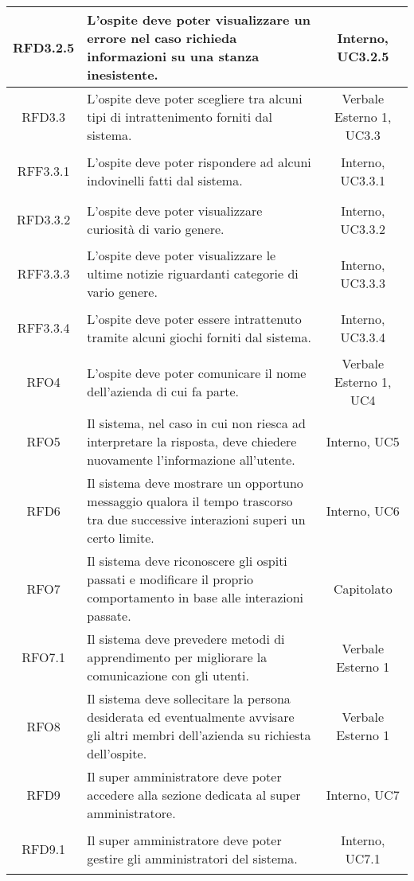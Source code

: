 \begin{longtable}{|c|>{\centering}m{7cm}|c|}
\hypertarget{RFD3.2.5}{RFD3.2.5} & L'ospite deve poter visualizzare un errore nel caso richieda informazioni su una stanza inesistente. & Interno, UC3.2.5\\ \hline
\hypertarget{RFD3.3}{RFD3.3} & L'ospite deve poter scegliere tra alcuni tipi di intrattenimento forniti dal sistema. & Verbale Esterno 1, UC3.3\\ \hline
\hypertarget{RFF3.3.1}{RFF3.3.1} & L'ospite deve poter rispondere ad alcuni indovinelli fatti dal sistema. & Interno, UC3.3.1\\ \hline
\hypertarget{RFD3.3.2}{RFD3.3.2} & L'ospite deve poter visualizzare curiosità  di vario genere. & Interno, UC3.3.2\\ \hline
\hypertarget{RFF3.3.3}{RFF3.3.3} & L'ospite deve poter visualizzare le ultime notizie riguardanti categorie di vario genere. & Interno, UC3.3.3\\ \hline
\hypertarget{RFF3.3.4}{RFF3.3.4} & L'ospite deve poter essere intrattenuto tramite alcuni giochi forniti dal sistema. & Interno, UC3.3.4\\ \hline
\hypertarget{RFO4}{RFO4} & L'ospite deve poter comunicare il nome dell'azienda di cui fa parte. & Verbale Esterno 1, UC4\\ \hline
\hypertarget{RFO5}{RFO5} & Il sistema, nel caso in cui non riesca ad interpretare la risposta, deve chiedere nuovamente l'informazione all'utente. & Interno, UC5\\ \hline
\hypertarget{RFD6}{RFD6} & Il sistema deve mostrare un opportuno messaggio qualora il tempo trascorso tra due successive interazioni superi un certo limite. & Interno, UC6\\ \hline
\hypertarget{RFO7}{RFO7} & Il sistema deve riconoscere gli ospiti passati e modificare il proprio comportamento in base alle interazioni passate. & Capitolato\\ \hline
\hypertarget{RFO7.1}{RFO7.1} & Il sistema deve prevedere metodi di apprendimento per migliorare la comunicazione con gli utenti. & Verbale Esterno 1\\ \hline
\hypertarget{RFO8}{RFO8} & Il sistema deve sollecitare la persona desiderata ed eventualmente avvisare gli altri membri dell'azienda su richiesta dell'ospite. & Verbale Esterno 1\\ \hline
\hypertarget{RFD9}{RFD9} & Il super amministratore deve poter accedere alla sezione dedicata al super amministratore. & Interno, UC7\\ \hline
\hypertarget{RFD9.1}{RFD9.1} & Il super amministratore deve poter gestire gli amministratori del sistema. & Interno, UC7.1\\ \hline

\end{longtable}
